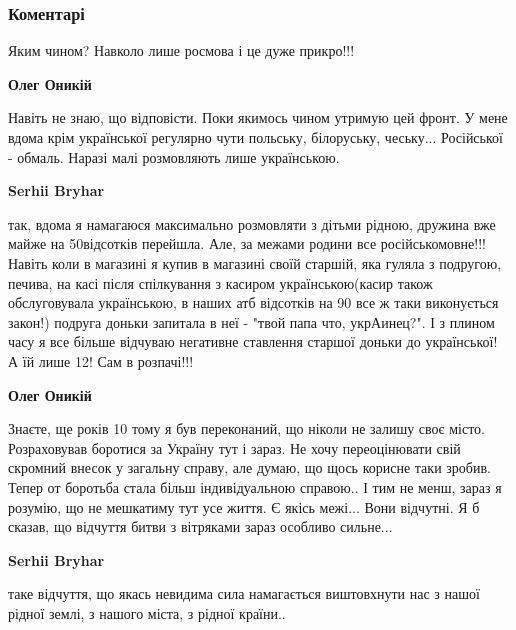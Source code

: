  
 
 
 
 
\subsubsection{Коментарі}

\begin{itemize} %
Яким чином? Навколо лише росмова і це дуже прикро!!!

\begin{itemize} %
\textbf{Олег Оникій} 

Навіть не знаю, що відповісти. Поки якимось чином утримую цей фронт. У мене
вдома крім української регулярно чути польську, білоруську, чеську...
Російської - обмаль. Наразі малі розмовляють лише українською.

\textbf{Serhii Bryhar} 

так, вдома я намагаюся максимально розмовляти з дітьми рідною, дружина вже
майже на 50відсотків перейшла. Але, за межами родини все російськомовне!!!
Навіть коли в магазині я купив в магазині своїй старшій, яка гуляла з подругою,
печива, на касі після спілкування з касиром українською(касир також
обслуговувала українською, в наших атб відсотків на 90 все ж таки виконується
закон!) подруга доньки запитала в неї - "твой папа что, укрАинец?". І з плином
часу я все більше відчуваю негативне ставлення старшої доньки до української! А
їй лише 12! Сам в розпачі!!!

\textbf{Олег Оникій} 

Знаєте, ще років 10 тому я був переконаний, що ніколи не залишу своє місто.
Розраховував боротися за Україну тут і зараз. Не хочу переоцінювати свій
скромний внесок у загальну справу, але думаю, що щось корисне таки зробив.
Тепер от боротьба стала більш індивідуальною справою.. І тим не менш, зараз я
розумію, що не мешкатиму тут усе життя. Є якісь межі... Вони відчутні. Я б
сказав, що відчуття битви з вітряками зараз особливо сильне...

\textbf{Serhii Bryhar} 

таке відчуття, що якась невидима сила намагається виштовхнути нас з нашої
рідної землі, з нашого міста, з рідної країни..


\end{itemize}
\end{itemize}
